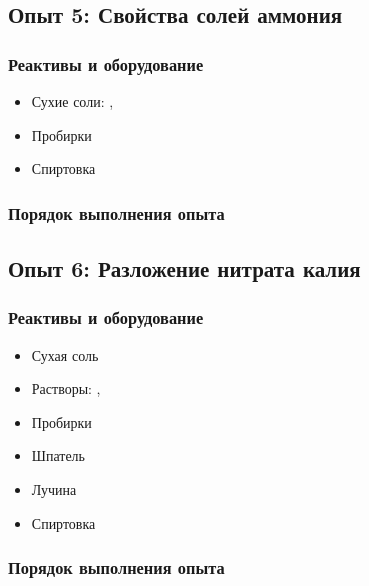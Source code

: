 \documentclass[a4paper, 12pt]{article}
\begin{document}
\subsection{Опыт 5: Свойства солей аммония}

\subsubsection{Реактивы и оборудование}

\begin{itemize}
	\item Сухие соли: , 
	
	\item Пробирки
	
	\item Спиртовка
\end{itemize}

\subsubsection{Порядок выполнения опыта}

\subsection{Опыт 6: Разложение нитрата калия}

\subsubsection{Реактивы и оборудование}

\begin{itemize}
	\item Сухая соль 
	
	\item Растворы: , 
	
	\item Пробирки
	
	\item Шпатель
	
	\item Лучина
	
	\item Спиртовка
\end{itemize}

\subsubsection{Порядок выполнения опыта}
\end{document}

